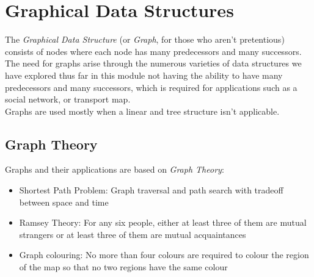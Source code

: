 
\section{Graphical Data Structures}
The \textit{Graphical Data Structure} (or \textit{Graph}, for those who aren't pretentious) consists of nodes where each node has many predecessors and many successors. The need for graphs arise through the numerous varieties of data structures we have explored thus far in this module not having the ability to have many predecessors and many successors, which is required for applications such as a social network, or transport map.\\

Graphs are used mostly when a linear and tree structure isn't applicable.

\subsection{Graph Theory}
Graphs and their applications are based on \textit{Graph Theory}:
\begin{itemize}
    \item Shortest Path Problem: Graph traversal and path search with tradeoff between space and time
    \item Ramsey Theory: For any six people, either at least three of them are mutual strangers or at least three of them are mutual acquaintances
    \item Graph colouring: No more than four colours are required to colour the region of the map so that no two regions have the same colour
\end{itemize}

